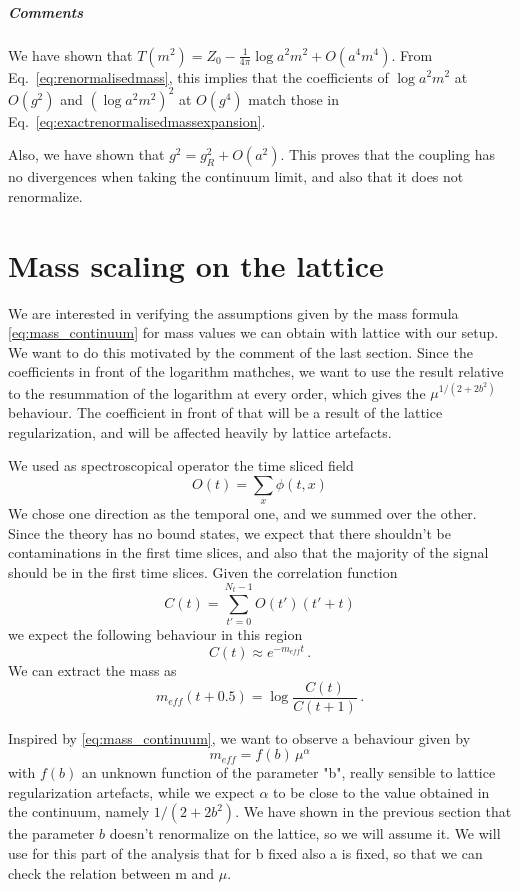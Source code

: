 \documentclass[12pt,a4paper]{report}
\newcommand{\eq}{Eq.}
\begin{document}
\paragraph{Comments}
We have shown that $T(m^2)=Z_0-\frac{1}{4\pi}\log a^2m^2 + O(a^4m^4)$.
From \eq~\eqref{eq:renormalisedmass}, this implies that the coefficients of $\log a^2m^2$ at $O(g^2)$ and $(\log a^2m^2)^2$ at $O(g^4)$ match those in \eq~\eqref{eq:exactrenormalisedmassexpansion}.

Also, we have shown that $g^2 = g^2_R +O(a^2)$. This proves that the coupling has no divergences when taking the continuum limit, and also that it does not renormalize.

 
\chapter{Mass scaling on the lattice} 
\label{sec:mass_scaling}
We are interested in verifying the assumptions given by the mass formula \eqref{eq:mass_continuum} for  mass values we can obtain with lattice with our setup. We want to do this motivated by the comment of the last section. Since the coefficients in front of the logarithm mathches, we want to use the result relative to the resummation of the logarithm at every order, which gives the $\mu^{1/(2+2b^2)}$ behaviour. The coefficient in front of that will be a result of the lattice regularization, and will be affected heavily by lattice artefacts.

We used as spectroscopical operator the time sliced field \begin{equation}
O(t) = \sum_x \phi(t,x)
\end{equation} We chose one direction as the temporal one, and we summed over the other. Since the theory has no bound states, we expect that there shouldn't be contaminations in the first time slices, and also that the majority of the signal should be in the first time slices. Given the correlation function \begin{equation}
C(t) = \sum_{t'=0}^{N_t-1} O(t') (t'+t) 
\end{equation} we expect the following behaviour in this region \begin{equation}
C(t) \approx e^{-m_{eff} t} \,.
\end{equation} We can extract the mass as \begin{equation}
m_{eff}(t+0.5) = \log \dfrac{C(t)}{C(t+1)} \,.
\end{equation}


Inspired by \eqref{eq:mass_continuum}, we want to observe a behaviour given by \begin{equation}
\label{eq:lattice_mass_scaling}
m_{eff}= f(b) \, \mu^\alpha
\end{equation} with $f(b)$  an unknown function of the parameter "b", really sensible to lattice regularization artefacts, while we expect $\alpha$ to be close to the value obtained in the continuum, namely $1/(2+2b^2)$. We have shown in the previous section that the parameter $b$ doesn't renormalize on the lattice, so we will assume it. We will use for this part of the analysis that for b fixed also a is fixed, so that we can check the relation between m and $\mu$.
\end{document}
